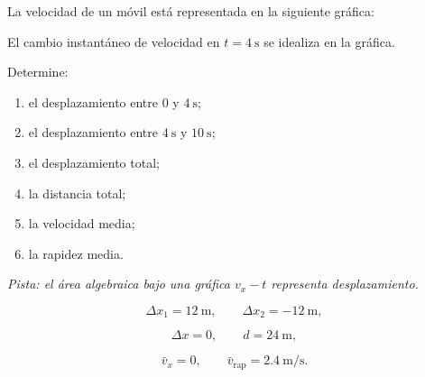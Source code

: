 \begin{ejercicio}
La velocidad de un móvil está representada en la siguiente gráfica:

\begin{center}
\end{center}

El cambio instantáneo de velocidad en \(t=\SI{4}{\second}\) se idealiza en la gráfica.

Determine:

\begin{enumerate}[label=\alph*)]
    \item el desplazamiento entre \(0\) y \(\SI{4}{\second}\);
    \item el desplazamiento entre \(\SI{4}{\second}\) y \(\SI{10}{\second}\);
    \item el desplazamiento total;
    \item la distancia total;
    \item la velocidad media;
    \item la rapidez media.
\end{enumerate}

\textit{Pista: el área algebraica bajo una gráfica \(v_x-t\) representa desplazamiento.}
\end{ejercicio}

\begin{respuesta}
\[
\Delta x_1=\SI{12}{\meter},
\qquad
\Delta x_2=-\SI{12}{\meter},
\]

\[
\Delta x=0,
\qquad
d=\SI{24}{\meter},
\]

\[
\bar{v}_x=0,
\qquad
\bar{v}_{\mathrm{rap}}=\SI{2.4}{\meter\per\second}.
\]
\end{respuesta}

